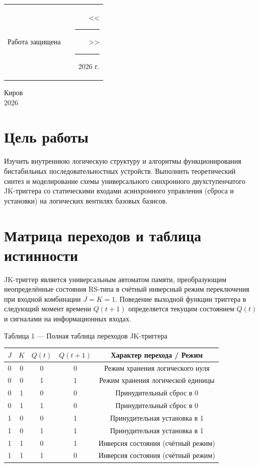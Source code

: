 \documentclass[oneside,a4paper,14pt]{extarticle}
\begin{document}
\noindent
\begin{tabular}{lp{58mm}r}
  Работа защищена &  & \hspace{5mm}<<\rule[-1mm]{5mm}{0.10mm}\/>>\rule[-1mm]{30mm}{0.10mm}\ 2026 г.
\end{tabular}
\vfill

\begin{center}
  Киров\\
  2026
\end{center}

\newpage\thispagestyle{plain}

\section{Цель работы}
Изучить внутреннюю логическую структуру и алгоритмы функционирования бистабильных последовательностных устройств. Выполнить теоретический синтез и моделирование схемы универсального синхронного двухступенчатого JK-триггера со статическими входами асинхронного управления (сброса и установки) на логических вентилях базовых базисов.

\section{Матрица переходов и таблица истинности}
JK-триггер является универсальным автоматом памяти, преобразующим неопределённые состояния RS-типа в счётный инверсный режим переключения при входной комбинации $J=K=1$. Поведение выходной функции триггера в следующий момент времени $Q(t+1)$ определяется текущим состоянием $Q(t)$ и сигналами на информационных входах.

\begin{center}
  Таблица 1 --- Полная таблица переходов JK-триггера \\
  \vspace{3mm}
  \begin{tabular}{ccc|c|c}
    $J$ & $K$ & $Q(t)$ & $Q(t+1)$ & Характер перехода / Режим \\
    \hline
    0 & 0 & 0 & 0 & Режим хранения логического нуля \\
    0 & 0 & 1 & 1 & Режим хранения логической единицы \\
    \hline
    0 & 1 & 0 & 0 & Принудительный сброс в 0 \\
    0 & 1 & 1 & 0 & Принудительный сброс в 0 \\
    \hline
    1 & 0 & 0 & 1 & Принудительная установка в 1 \\
    1 & 0 & 1 & 1 & Принудительная установка в 1 \\
    \hline
    1 & 1 & 0 & 1 & Инверсия состояния (счётный режим) \\
    1 & 1 & 1 & 0 & Инверсия состояния (счётный режим) \\
  \end{tabular}
\end{center}
\end{document}
